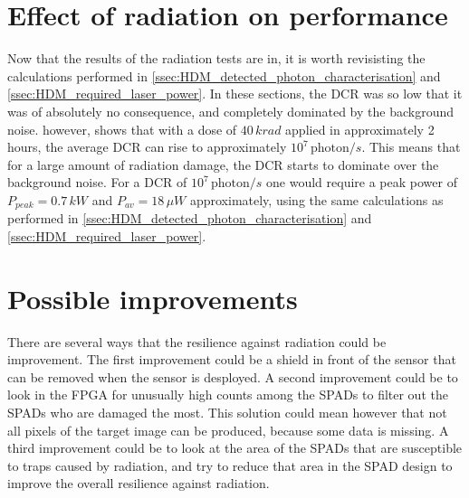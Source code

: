 \section{Effect of radiation on performance}\label{ssec:effect_on_performance}
Now that the results of the radiation tests are in, it is worth revisisting the calculations performed in \cref{ssec:HDM_detected_photon_characterisation} and \cref{ssec:HDM_required_laser_power}.
In these sections, the DCR was so low that it was of absolutely no consequence, and completely dominated by the background noise.  however, shows that with a dose of $40\,krad$ applied in approximately 2 hours, the average DCR can rise to approximately $10^{7}\,\text{photon}/s$. This means that for a large amount of radiation damage, the DCR starts to dominate over the background noise. For a DCR of $10^{7}\,\text{photon}/s$ one would require a peak power of $P_{peak}=0.7\,kW$ and $P_{av}=18\,\mu W$ approximately, using the same calculations as performed in \cref{ssec:HDM_detected_photon_characterisation} and \cref{ssec:HDM_required_laser_power}.

\section{Possible improvements}\label{ssec:possible_improvements}
There are several ways that the resilience against radiation could be improvement. The first improvement could be a shield in front of the sensor that can be removed when the sensor is desployed. A second improvement could be to look in the FPGA for unusually high counts among the SPADs to filter out the SPADs who are damaged the most. This solution could mean however that not all pixels of the target image can be produced, because some data is missing. A third improvement could be to look at the area of the SPADs that are susceptible to traps caused by radiation, and try to reduce that area in the SPAD design to improve the overall resilience against radiation.
